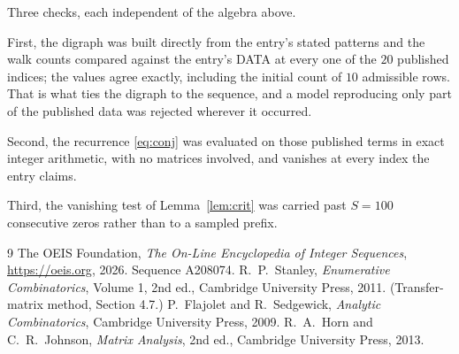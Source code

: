 \documentclass[11pt,a4paper]{article}
\theoremstyle{plain}
\theoremstyle{definition}
\begin{document}
Three checks, each independent of the algebra above.

First, the digraph was built directly from the entry's stated patterns and the walk counts
compared against the entry's DATA at every one of the $20$ published indices; the
values agree exactly, including the initial count of $10$ admissible rows. That is
what ties the digraph to the sequence, and a model reproducing only part of the published
data was rejected wherever it occurred.

Second, the recurrence \eqref{eq:conj} was evaluated on those published terms in exact
integer arithmetic, with no matrices involved, and vanishes at every index the entry claims.

Third, the vanishing test of Lemma~\ref{lem:crit} was carried past $S=100$ consecutive
zeros rather than to a sampled prefix.

\begin{thebibliography}{9}
 The OEIS Foundation, \emph{The On-Line Encyclopedia of Integer
Sequences}, \url{https://oeis.org}, 2026. Sequence A208074.
 R.~P.~Stanley, \emph{Enumerative Combinatorics}, Volume 1, 2nd ed.,
Cambridge University Press, 2011. (Transfer-matrix method, Section 4.7.)
 P.~Flajolet and R.~Sedgewick, \emph{Analytic Combinatorics}, Cambridge
University Press, 2009.
 R.~A.~Horn and C.~R.~Johnson, \emph{Matrix Analysis}, 2nd ed., Cambridge
University Press, 2013.
\end{thebibliography}
\end{document}
